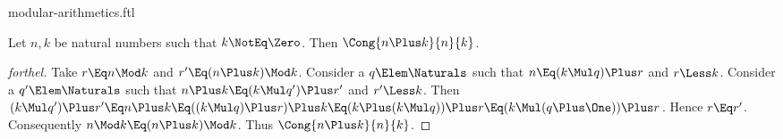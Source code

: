 \documentclass{stex}
\begin{document}
\begin{smodule}{modular-arithmetics.ftl}
\begin{proposition*}[forthel,name=congruency of sum]
  Let $n, k$ be natural numbers such that $k \NotEq \Zero$.
  Then $\Cong{n \Plus k}{n}{k}$.
\end{proposition*}
\begin{proof}[forthel]
  Take $r \Eq n \Mod k$ and $r' \Eq (n \Plus k) \Mod k$.
  Consider a $q \Elem \Naturals$ such that $n \Eq (k \Mul q) \Plus r$ and $r \Less k$.
  Consider a $q' \Elem \Naturals$ such that $n \Plus k \Eq (k \Mul q') \Plus r'$ and
  $r' \Less k$.
  Then $(k \Mul q') \Plus r'
    \Eq n \Plus k
    \Eq ((k \Mul q) \Plus r) \Plus k
    \Eq (k \Plus (k \Mul q)) \Plus r
    \Eq (k \Mul (q \Plus \One)) \Plus r$.
  Hence $r \Eq r'$.
  Consequently $n \Mod k \Eq (n \Plus k) \Mod k$.
  Thus $\Cong{n \Plus k}{n}{k}$.
\end{proof}

\end{smodule}
\end{document}
